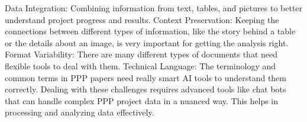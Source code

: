 \vskip 0.5cm
Data Integration: Combining information from text, tables, and pictures to better understand project progress and results.%
Context Preservation: Keeping the connections between different types of information, like the story behind a table or the details about an image, is very important for getting the analysis right.%
Format Variability: There are many different types of documents that need flexible tools to deal with them.
Technical Language: The terminology and common terms in PPP papers need really smart AI tools to understand them correctly.
\vskip 0.5cm
Dealing with these challenges requires advanced tools like chat bots that can handle complex PPP project data in a nuanced way. This helps in processing and analyzing data effectively.

